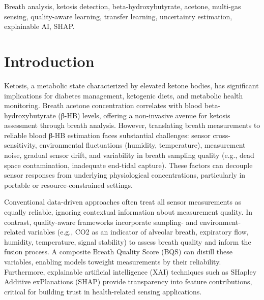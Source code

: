 \documentclass{ieeeaccess}
\begin{document}

\begin{keywords}
Breath analysis, ketosis detection, beta-hydroxybutyrate, acetone,
multi-gas sensing, quality-aware learning, transfer learning,
uncertainty estimation, explainable AI, SHAP.
\end{keywords}

\titlepgskip=-15pt

\maketitle


\section{Introduction}
\label{sec:introduction}

Ketosis, a metabolic state characterized by elevated ketone bodies, has significant implications for diabetes management, ketogenic diets, and metabolic health monitoring. Breath acetone concentration correlates with blood beta-hydroxybutyrate (β-HB) levels, offering a non-invasive avenue for ketosis assessment through breath analysis. However, translating breath measurements to reliable blood β-HB estimation faces substantial challenges: sensor cross-sensitivity, environmental fluctuations (humidity, temperature), measurement noise, gradual sensor drift, and variability in breath sampling quality (e.g., dead space contamination, inadequate end-tidal capture). These factors can decouple sensor responses from underlying physiological concentrations, particularly in portable or resource-constrained settings.

Conventional data-driven approaches often treat all sensor measurements as equally reliable, ignoring contextual information about measurement quality. In contrast, quality-aware frameworks incorporate sampling- and environment-related variables (e.g., CO2 as an indicator of alveolar breath, expiratory flow, humidity, temperature, signal stability) to assess breath quality and inform the fusion process. A composite Breath Quality Score (BQS) can distill these variables, enabling models toweight measurements by their reliability. Furthermore, explainable artificial intelligence (XAI) techniques such as SHapley Additive exPlanations (SHAP) provide transparency into feature contributions, critical for building trust in health-related sensing applications.
\end{document}
